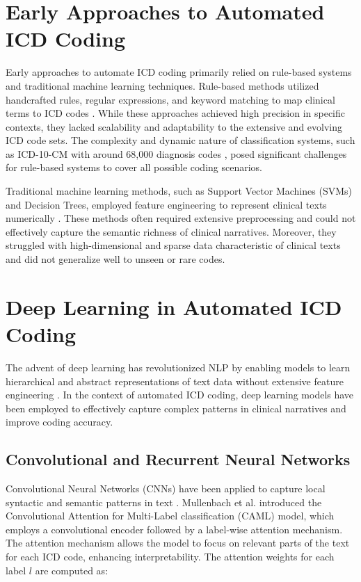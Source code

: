 \documentclass[12pt,a4paper]{report}
\begin{document}
\section{Early Approaches to Automated ICD Coding}

Early approaches to automate ICD coding primarily relied on rule-based systems and traditional machine learning techniques. Rule-based methods utilized handcrafted rules, regular expressions, and keyword matching to map clinical terms to ICD codes \cite{farkas2008automatic, scheurwegs2017data}. While these approaches achieved high precision in specific contexts, they lacked scalability and adaptability to the extensive and evolving ICD code sets. The complexity and dynamic nature of classification systems, such as ICD-10-CM with around 68,000 diagnosis codes \cite{dong2022automated}, posed significant challenges for rule-based systems to cover all possible coding scenarios.

Traditional machine learning methods, such as Support Vector Machines (SVMs) and Decision Trees, employed feature engineering to represent clinical texts numerically \cite{perotte2014diagnosis}. These methods often required extensive preprocessing and could not effectively capture the semantic richness of clinical narratives. Moreover, they struggled with high-dimensional and sparse data characteristic of clinical texts and did not generalize well to unseen or rare codes.

\section{Deep Learning in Automated ICD Coding}

The advent of deep learning has revolutionized NLP by enabling models to learn hierarchical and abstract representations of text data without extensive feature engineering \cite{lecun2015deep}. In the context of automated ICD coding, deep learning models have been employed to effectively capture complex patterns in clinical narratives and improve coding accuracy.

\subsection{Convolutional and Recurrent Neural Networks}

Convolutional Neural Networks (CNNs) have been applied to capture local syntactic and semantic patterns in text \cite{kim2014convolutional}. Mullenbach et al. \cite{mullenbach2018explainable} introduced the Convolutional Attention for Multi-Label classification (CAML) model, which employs a convolutional encoder followed by a label-wise attention mechanism. The attention mechanism allows the model to focus on relevant parts of the text for each ICD code, enhancing interpretability. The attention weights for each label $l$ are computed as:
\end{document}
